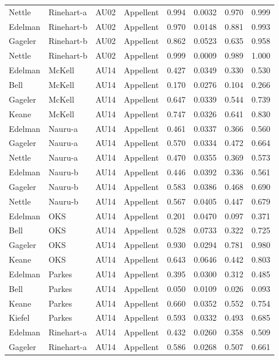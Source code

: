 \documentclass{monashthesis}
\begin{document}
\begin{center}
\begin{longtable}{llllllll}
Nettle & Rinehart-a & AU02 & Appellent & 0.994 & 0.0032 & 0.970 & 0.999 \\
Edelman & Rinehart-b & AU02 & Appellent & 0.970 & 0.0148 & 0.881 & 0.993 \\
Gageler & Rinehart-b & AU02 & Appellent & 0.862 & 0.0523 & 0.635 & 0.958 \\
Nettle & Rinehart-b & AU02 & Appellent & 0.999 & 0.0009 & 0.989 & 1.000 \\
Edelman & McKell & AU14 & Appellent & 0.427 & 0.0349 & 0.330 & 0.530 \\
Bell & McKell & AU14 & Appellent & 0.170 & 0.0276 & 0.104 & 0.266 \\
Gageler & McKell & AU14 & Appellent & 0.647 & 0.0339 & 0.544 & 0.739 \\
Keane & McKell & AU14 & Appellent & 0.747 & 0.0326 & 0.641 & 0.830 \\
Edelman & Nauru-a & AU14 & Appellent & 0.461 & 0.0337 & 0.366 & 0.560 \\
Gageler & Nauru-a & AU14 & Appellent & 0.570 & 0.0334 & 0.472 & 0.664 \\
Nettle & Nauru-a & AU14 & Appellent & 0.470 & 0.0355 & 0.369 & 0.573 \\
Edelman & Nauru-b & AU14 & Appellent & 0.446 & 0.0392 & 0.336 & 0.561 \\
Gageler & Nauru-b & AU14 & Appellent & 0.583 & 0.0386 & 0.468 & 0.690 \\
Nettle & Nauru-b & AU14 & Appellent & 0.567 & 0.0405 & 0.447 & 0.679 \\
Edelman & OKS & AU14 & Appellent & 0.201 & 0.0470 & 0.097 & 0.371 \\
Bell & OKS & AU14 & Appellent & 0.528 & 0.0733 & 0.322 & 0.725 \\
Gageler & OKS & AU14 & Appellent & 0.930 & 0.0294 & 0.781 & 0.980 \\
Keane & OKS & AU14 & Appellent & 0.643 & 0.0646 & 0.442 & 0.803 \\
Edelman & Parkes & AU14 & Appellent & 0.395 & 0.0300 & 0.312 & 0.485 \\
Bell & Parkes & AU14 & Appellent & 0.050 & 0.0109 & 0.026 & 0.093 \\
Keane & Parkes & AU14 & Appellent & 0.660 & 0.0352 & 0.552 & 0.754 \\
Kiefel & Parkes & AU14 & Appellent & 0.593 & 0.0332 & 0.493 & 0.685 \\
Edelman & Rinehart-a & AU14 & Appellent & 0.432 & 0.0260 & 0.358 & 0.509 \\
Gageler & Rinehart-a & AU14 & Appellent & 0.586 & 0.0268 & 0.507 & 0.661 \\

\end{longtable}
\end{center}
\end{document}
